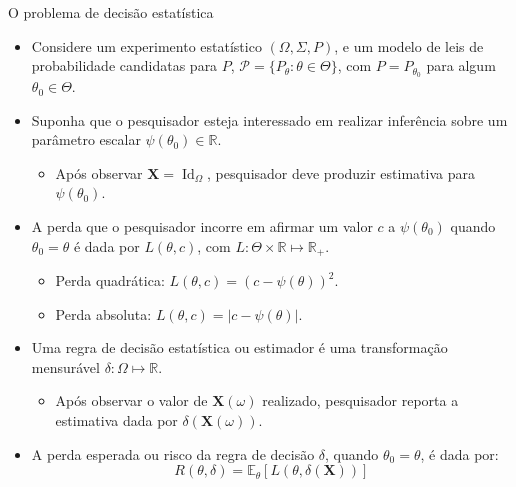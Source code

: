 \documentclass[11pt]{beamer}
\begin{document}
	\begin{frame}{O problema de decisão estatística}
	\begin{itemize}
		\item Considere um experimento estatístico $(\Omega,\Sigma, P)$, e um modelo de leis de probabilidade candidatas para $P$, $\mathcal{P} = \{P_\theta:\theta \in \Theta\}$, com $P=P_{\theta_0}$ para algum $\theta_0 \in \Theta$.
		\item Suponha que o pesquisador esteja interessado em realizar inferência sobre um parâmetro  escalar $\psi(\theta_0) \in \mathbb{R}$.
		\begin{itemize}
					\item Após observar $\boldsymbol{X} =\operatorname{Id}_\Omega$, pesquisador deve produzir  estimativa para $\psi(\theta_0)$.
		\end{itemize}
		\item A {\color{blue}perda} que o pesquisador incorre em afirmar um valor $c$ a $\psi(\theta_0)$ quando $\theta_0 = \theta$ é dada por $L(\theta,c)$, com $L: \Theta \times \mathbb{R} \mapsto \mathbb{R}_+$.
		\begin{itemize}
			\item Perda quadrática: $L(\theta,c)= (c-\psi(\theta))^2$.
			\item Perda absoluta: $L(\theta,c) = |c-\psi(\theta)|$.
		\end{itemize}
		\item Uma {\color{blue}regra de decisão estatística} ou estimador é uma transformação mensurável $\delta:\Omega \mapsto \mathbb{R}$.
		\begin{itemize}
			\item Após observar o valor de $\boldsymbol{X}(\omega)$ realizado,  pesquisador reporta a estimativa dada por $\delta(\boldsymbol{X}(\omega))$.
		\end{itemize}
		\item A perda esperada ou risco da regra de decisão $\delta$, quando $\theta_0=\theta$, é dada por:
	$$R(\theta, \delta)=\mathbb{E}_\theta[L(\theta, \delta(\boldsymbol{X}))]$$

	\end{itemize}
	\end{frame}
	
\end{document}
